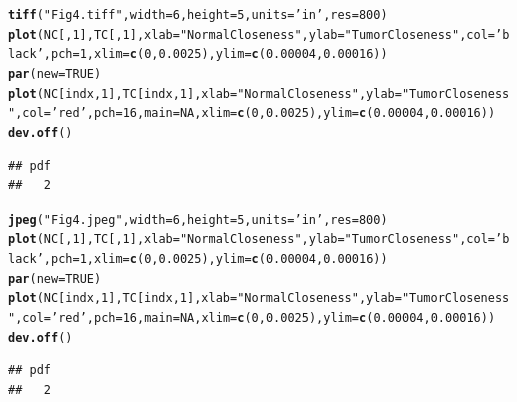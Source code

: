 \documentclass{article}\usepackage[]{graphicx}\usepackage[]{color}
\makeatletter
\newcommand{\hlnum}[1]{\textcolor[rgb]{0.686,0.059,0.569}{#1}}%
\newcommand{\hlstr}[1]{\textcolor[rgb]{0.192,0.494,0.8}{#1}}%
\newcommand{\hlstd}[1]{\textcolor[rgb]{0.345,0.345,0.345}{#1}}%
\newcommand{\hlkwc}[1]{\textcolor[rgb]{0.333,0.667,0.333}{#1}}%
\newcommand{\hlkwd}[1]{\textcolor[rgb]{0.737,0.353,0.396}{\textbf{#1}}}%
\newenvironment{kframe}{%
 \def\at@end@of@kframe{}%
 \ifinner\ifhmode%
  \def\at@end@of@kframe{\end{minipage}}%
  \begin{minipage}{\columnwidth}%
 \fi\fi%
 \def\FrameCommand##1{\hskip\@totalleftmargin \hskip-\fboxsep
 \colorbox{shadecolor}{##1}\hskip-\fboxsep
     \hskip-\linewidth \hskip-\@totalleftmargin \hskip\columnwidth}%
 \MakeFramed {\advance\hsize-\width
   \@totalleftmargin\z@ \linewidth\hsize
   \@setminipage}}%
 {\par\unskip\endMakeFramed%
 \at@end@of@kframe}
\newenvironment{knitrout}{}{} %
\makeatother
\begin{document}
\begin{knitrout}
\begin{kframe}
\begin{alltt}
\hlkwd{tiff}\hlstd{(}\hlstr{"Fig4.tiff"}\hlstd{,} \hlkwc{width} \hlstd{=} \hlnum{6}\hlstd{,} \hlkwc{height} \hlstd{=} \hlnum{5}\hlstd{,} \hlkwc{units} \hlstd{=} \hlstr{'in'}\hlstd{,} \hlkwc{res} \hlstd{=} \hlnum{800}\hlstd{)}
\hlkwd{plot}\hlstd{(NC[,}\hlnum{1}\hlstd{], TC[,}\hlnum{1}\hlstd{],} \hlkwc{xlab} \hlstd{=} \hlstr{"Normal Closeness"}\hlstd{,} \hlkwc{ylab} \hlstd{=} \hlstr{"Tumor Closeness"}\hlstd{,} \hlkwc{col} \hlstd{=} \hlstr{'black'}\hlstd{,} \hlkwc{pch} \hlstd{=} \hlnum{1}\hlstd{,} \hlkwc{xlim} \hlstd{=} \hlkwd{c}\hlstd{(}\hlnum{0}\hlstd{,}\hlnum{0.0025}\hlstd{),} \hlkwc{ylim} \hlstd{=} \hlkwd{c}\hlstd{(}\hlnum{0.00004}\hlstd{,}\hlnum{0.00016}\hlstd{))}
\hlkwd{par}\hlstd{(}\hlkwc{new}\hlstd{=}\hlnum{TRUE}\hlstd{)}
\hlkwd{plot}\hlstd{(NC[indx,}\hlnum{1}\hlstd{], TC[indx,}\hlnum{1}\hlstd{],} \hlkwc{xlab} \hlstd{=} \hlstr{"Normal Closeness"}\hlstd{,} \hlkwc{ylab} \hlstd{=} \hlstr{"Tumor Closeness"}\hlstd{,} \hlkwc{col} \hlstd{=} \hlstr{'red'}\hlstd{,} \hlkwc{pch} \hlstd{=} \hlnum{16}\hlstd{,}  \hlkwc{main} \hlstd{=} \hlnum{NA}\hlstd{,} \hlkwc{xlim} \hlstd{=} \hlkwd{c}\hlstd{(}\hlnum{0}\hlstd{,}\hlnum{0.0025}\hlstd{),} \hlkwc{ylim} \hlstd{=} \hlkwd{c}\hlstd{(}\hlnum{0.00004}\hlstd{,}\hlnum{0.00016}\hlstd{))}
\hlkwd{dev.off}\hlstd{()}
\end{alltt}
\begin{verbatim}
## pdf 
##   2
\end{verbatim}
\begin{alltt}
\hlkwd{jpeg}\hlstd{(}\hlstr{"Fig4.jpeg"}\hlstd{,} \hlkwc{width} \hlstd{=} \hlnum{6}\hlstd{,} \hlkwc{height} \hlstd{=} \hlnum{5}\hlstd{,} \hlkwc{units} \hlstd{=} \hlstr{'in'}\hlstd{,} \hlkwc{res} \hlstd{=} \hlnum{800}\hlstd{)}
\hlkwd{plot}\hlstd{(NC[,}\hlnum{1}\hlstd{], TC[,}\hlnum{1}\hlstd{],} \hlkwc{xlab} \hlstd{=} \hlstr{"Normal Closeness"}\hlstd{,} \hlkwc{ylab} \hlstd{=} \hlstr{"Tumor Closeness"}\hlstd{,} \hlkwc{col} \hlstd{=} \hlstr{'black'}\hlstd{,} \hlkwc{pch} \hlstd{=} \hlnum{1}\hlstd{,} \hlkwc{xlim} \hlstd{=} \hlkwd{c}\hlstd{(}\hlnum{0}\hlstd{,}\hlnum{0.0025}\hlstd{),} \hlkwc{ylim} \hlstd{=} \hlkwd{c}\hlstd{(}\hlnum{0.00004}\hlstd{,}\hlnum{0.00016}\hlstd{))}
\hlkwd{par}\hlstd{(}\hlkwc{new}\hlstd{=}\hlnum{TRUE}\hlstd{)}
\hlkwd{plot}\hlstd{(NC[indx,}\hlnum{1}\hlstd{], TC[indx,}\hlnum{1}\hlstd{],} \hlkwc{xlab} \hlstd{=} \hlstr{"Normal Closeness"}\hlstd{,} \hlkwc{ylab} \hlstd{=} \hlstr{"Tumor Closeness"}\hlstd{,} \hlkwc{col} \hlstd{=} \hlstr{'red'}\hlstd{,} \hlkwc{pch} \hlstd{=} \hlnum{16}\hlstd{,}  \hlkwc{main} \hlstd{=} \hlnum{NA}\hlstd{,} \hlkwc{xlim} \hlstd{=} \hlkwd{c}\hlstd{(}\hlnum{0}\hlstd{,}\hlnum{0.0025}\hlstd{),} \hlkwc{ylim} \hlstd{=} \hlkwd{c}\hlstd{(}\hlnum{0.00004}\hlstd{,}\hlnum{0.00016}\hlstd{))}
\hlkwd{dev.off}\hlstd{()}
\end{alltt}
\begin{verbatim}
## pdf 
##   2
\end{verbatim}
\end{kframe}
\end{knitrout}
\end{document}
